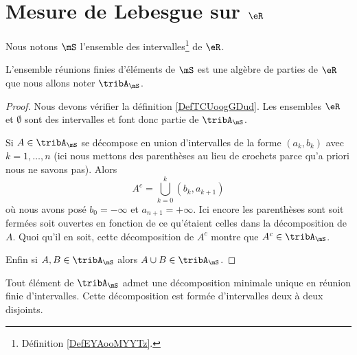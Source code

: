 
\section{Mesure de Lebesgue sur \texorpdfstring{$ \eR$}{R}}
\label{SecZTFooXlkwk}

Nous notons \( \mS\) l'ensemble des intervalles\footnote{Définition \ref{DefEYAooMYYTz}.} de \( \eR\).

\begin{proposition}
    L'ensemble réunions finies d'éléments de \( \mS\) est une algèbre de parties de \( \eR\) que nous allons noter \( \tribA_{\mS}\).
\end{proposition}

\begin{proof}

    Nous devons vérifier la définition \ref{DefTCUoogGDud}. Les ensembles \( \eR\) et \( \emptyset\) sont des intervalles et font donc partie de \( \tribA_{\mS}\).
    
    Si \( A\in\tribA_{\mS}\) se décompose en union d'intervalles de la forme \( (a_k,b_k)\) avec \( k=1,\ldots, n\) (ici nous mettons des parenthèses au lieu de crochets parce qu'a priori nous ne savons pas). Alors
    \begin{equation}
        A^c=\bigcup_{k=0}^{k}(b_k,a_{k+1})
    \end{equation}
    où nous avons posé \( b_0=-\infty\) et \( a_{n+1}=+\infty\). Ici encore les parenthèses sont soit fermées soit ouvertes en fonction de ce qu'étaient celles dans la décomposition de \( A\). Quoi qu'il en soit, cette décomposition de \( A^c\) montre que \( A^c\in\tribA_{\mS}\).

    Enfin si \( A,B\in\tribA_{\mS}\) alors \( A\cup B\in\tribA_{\mS}\).
\end{proof}

\begin{lemma}
    Tout élément de \( \tribA_{\mS}\) admet une décomposition minimale unique en réunion finie d'intervalles. Cette décomposition est formée d'intervalles deux à deux disjoints.
\end{lemma}

